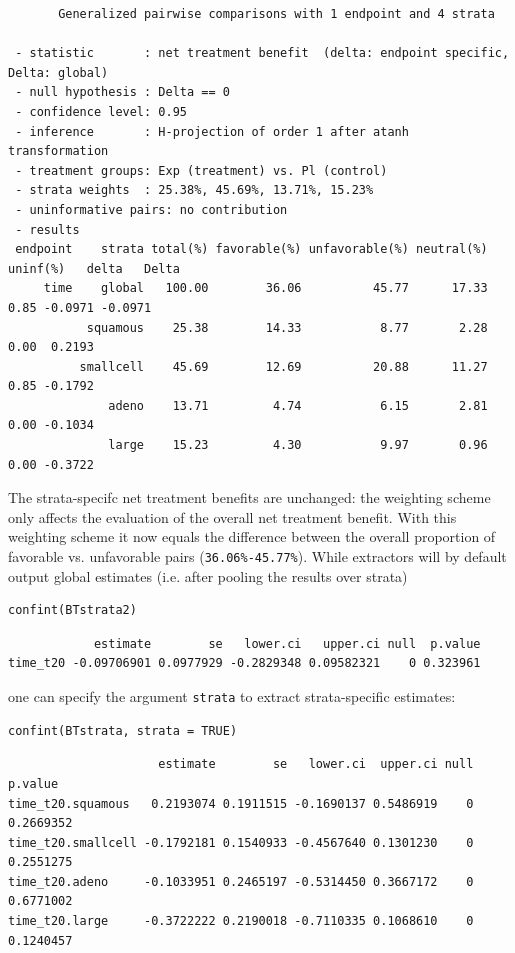 \documentclass[12pt]{article}
\begin{document}
\begin{verbatim}
       Generalized pairwise comparisons with 1 endpoint and 4 strata

 - statistic       : net treatment benefit  (delta: endpoint specific, Delta: global) 
 - null hypothesis : Delta == 0 
 - confidence level: 0.95 
 - inference       : H-projection of order 1 after atanh transformation 
 - treatment groups: Exp (treatment) vs. Pl (control) 
 - strata weights  : 25.38%, 45.69%, 13.71%, 15.23% 
 - uninformative pairs: no contribution
 - results
 endpoint    strata total(%) favorable(%) unfavorable(%) neutral(%) uninf(%)   delta   Delta
     time    global   100.00        36.06          45.77      17.33     0.85 -0.0971 -0.0971
           squamous    25.38        14.33           8.77       2.28     0.00  0.2193        
          smallcell    45.69        12.69          20.88      11.27     0.85 -0.1792        
              adeno    13.71         4.74           6.15       2.81     0.00 -0.1034        
              large    15.23         4.30           9.97       0.96     0.00 -0.3722
\end{verbatim}

The strata-specifc net treatment benefits are unchanged: the weighting
scheme only affects the evaluation of the overall net treatment
benefit. With this weighting scheme it now equals the difference
between the overall proportion of favorable vs. unfavorable pairs
(\texttt{36.06\%-45.77\%}). While extractors will by default output global
estimates (i.e. after pooling the results over strata)
\lstset{language=r,label= ,caption= ,captionpos=b,numbers=none}
\begin{lstlisting}
confint(BTstrata2)
\end{lstlisting}

\begin{verbatim}
            estimate        se   lower.ci   upper.ci null  p.value
time_t20 -0.09706901 0.0977929 -0.2829348 0.09582321    0 0.323961
\end{verbatim}


one can specify the argument \texttt{strata} to extract strata-specific estimates:
\lstset{language=r,label= ,caption= ,captionpos=b,numbers=none}
\begin{lstlisting}
confint(BTstrata, strata = TRUE)
\end{lstlisting}

\begin{verbatim}
                     estimate        se   lower.ci  upper.ci null   p.value
time_t20.squamous   0.2193074 0.1911515 -0.1690137 0.5486919    0 0.2669352
time_t20.smallcell -0.1792181 0.1540933 -0.4567640 0.1301230    0 0.2551275
time_t20.adeno     -0.1033951 0.2465197 -0.5314450 0.3667172    0 0.6771002
time_t20.large     -0.3722222 0.2190018 -0.7110335 0.1068610    0 0.1240457
\end{verbatim}
\end{document}
